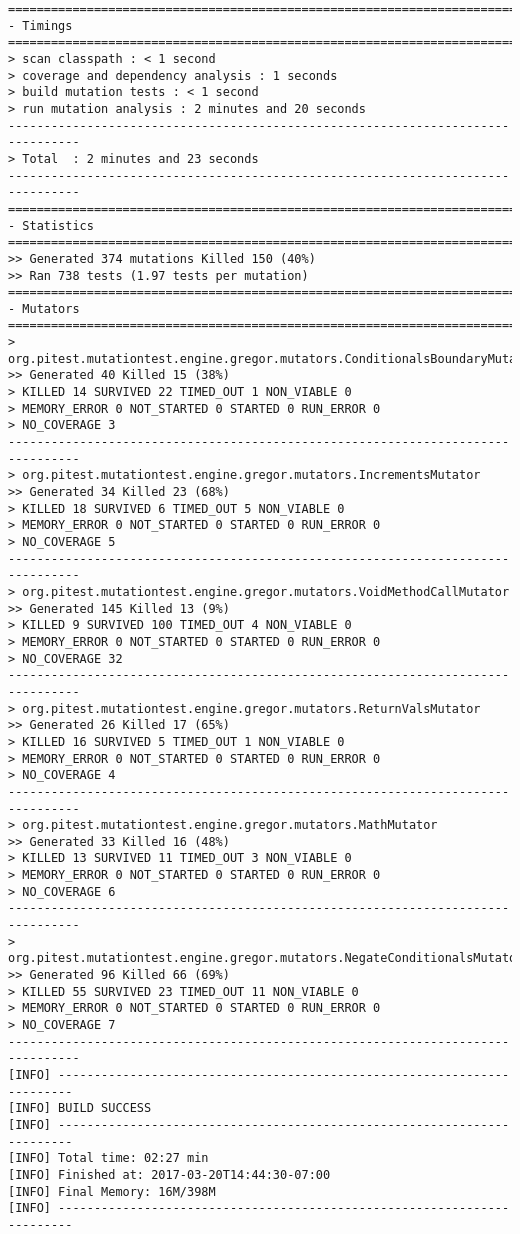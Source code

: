 \begin{lstlisting}
================================================================================
- Timings
================================================================================
> scan classpath : < 1 second
> coverage and dependency analysis : 1 seconds
> build mutation tests : < 1 second
> run mutation analysis : 2 minutes and 20 seconds
--------------------------------------------------------------------------------
> Total  : 2 minutes and 23 seconds
--------------------------------------------------------------------------------
================================================================================
- Statistics
================================================================================
>> Generated 374 mutations Killed 150 (40%)
>> Ran 738 tests (1.97 tests per mutation)
================================================================================
- Mutators
================================================================================
> org.pitest.mutationtest.engine.gregor.mutators.ConditionalsBoundaryMutator
>> Generated 40 Killed 15 (38%)
> KILLED 14 SURVIVED 22 TIMED_OUT 1 NON_VIABLE 0 
> MEMORY_ERROR 0 NOT_STARTED 0 STARTED 0 RUN_ERROR 0 
> NO_COVERAGE 3 
--------------------------------------------------------------------------------
> org.pitest.mutationtest.engine.gregor.mutators.IncrementsMutator
>> Generated 34 Killed 23 (68%)
> KILLED 18 SURVIVED 6 TIMED_OUT 5 NON_VIABLE 0 
> MEMORY_ERROR 0 NOT_STARTED 0 STARTED 0 RUN_ERROR 0 
> NO_COVERAGE 5 
--------------------------------------------------------------------------------
> org.pitest.mutationtest.engine.gregor.mutators.VoidMethodCallMutator
>> Generated 145 Killed 13 (9%)
> KILLED 9 SURVIVED 100 TIMED_OUT 4 NON_VIABLE 0 
> MEMORY_ERROR 0 NOT_STARTED 0 STARTED 0 RUN_ERROR 0 
> NO_COVERAGE 32 
--------------------------------------------------------------------------------
> org.pitest.mutationtest.engine.gregor.mutators.ReturnValsMutator
>> Generated 26 Killed 17 (65%)
> KILLED 16 SURVIVED 5 TIMED_OUT 1 NON_VIABLE 0 
> MEMORY_ERROR 0 NOT_STARTED 0 STARTED 0 RUN_ERROR 0 
> NO_COVERAGE 4 
--------------------------------------------------------------------------------
> org.pitest.mutationtest.engine.gregor.mutators.MathMutator
>> Generated 33 Killed 16 (48%)
> KILLED 13 SURVIVED 11 TIMED_OUT 3 NON_VIABLE 0 
> MEMORY_ERROR 0 NOT_STARTED 0 STARTED 0 RUN_ERROR 0 
> NO_COVERAGE 6 
--------------------------------------------------------------------------------
> org.pitest.mutationtest.engine.gregor.mutators.NegateConditionalsMutator
>> Generated 96 Killed 66 (69%)
> KILLED 55 SURVIVED 23 TIMED_OUT 11 NON_VIABLE 0 
> MEMORY_ERROR 0 NOT_STARTED 0 STARTED 0 RUN_ERROR 0 
> NO_COVERAGE 7 
--------------------------------------------------------------------------------
[INFO] ------------------------------------------------------------------------
[INFO] BUILD SUCCESS
[INFO] ------------------------------------------------------------------------
[INFO] Total time: 02:27 min
[INFO] Finished at: 2017-03-20T14:44:30-07:00
[INFO] Final Memory: 16M/398M
[INFO] ------------------------------------------------------------------------
\end{lstlisting}

